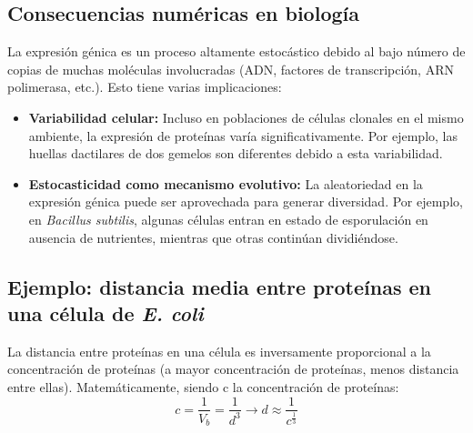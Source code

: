 \subsection{Consecuencias numéricas en biología}
La expresión génica es un proceso altamente estocástico debido al bajo número de copias de muchas moléculas involucradas (ADN, factores de transcripción, ARN polimerasa, etc.). Esto tiene varias implicaciones:
\begin{itemize}
\item \textbf{Variabilidad celular:} Incluso en poblaciones de células clonales en el mismo ambiente, la expresión de proteínas varía significativamente. Por ejemplo, las huellas dactilares de dos gemelos son diferentes debido a esta variabilidad.
\item \textbf{Estocasticidad como mecanismo evolutivo:} La aleatoriedad en la expresión génica puede ser aprovechada para generar diversidad. Por ejemplo, en \textit{Bacillus subtilis}, algunas células entran en estado de esporulación en ausencia de nutrientes, mientras que otras continúan dividiéndose.
\end{itemize}

\subsection{Ejemplo: distancia media entre proteínas en una célula de \textit{E. coli}}
La distancia entre proteínas en una célula es inversamente proporcional a la concentración de proteínas (a mayor concentración de proteínas, menos distancia entre ellas). Matemáticamente, siendo c la concentración de proteínas:
$$c = \frac{1}{V_b} = \frac{1}{d^3} \rightarrow d \approx \frac{1}{c^{\frac{1}{3}}}$$

